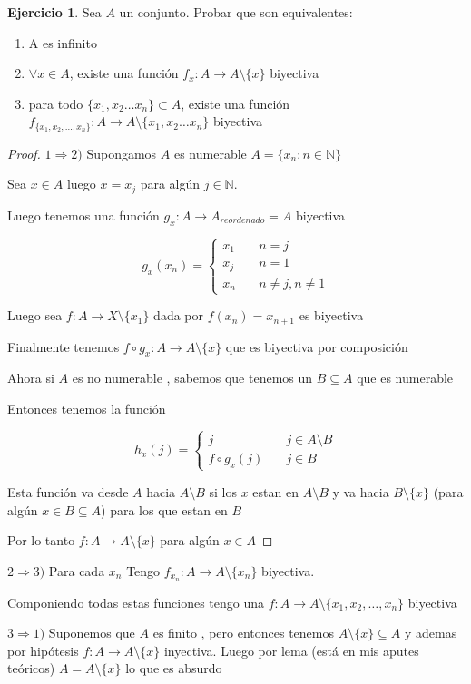 \documentclass[12pt]{article}
\newcommand{\N}{\mathbb{N}}
\newcommand{\Ra}{\Rightarrow}
\newcommand{\ra}{\rightarrow}
\theoremstyle{definition}
\newtheorem{ej}{Ejercicio}
\begin{document}
  \begin{ej}
\noindent  Sea $A$ un conjunto. Probar que son equivalentes:
\begin{enumerate}
  \item A es infinito 
  \item $\forall x \in A$, existe una función $f_{x}: A \ra A \setminus \{x\}$ biyectiva
  \item para todo $\{x_{1}, x_{2} \dots x_{n}\} \subset A$, existe una función $f_{\{ x_{1}, x_{2}, \dots , x_{n} \}}: A \ra A \setminus \{x_{1},x_{2} \dots x_{n} \}$ biyectiva
\end{enumerate}

\begin{proof}
   $1 \Ra 2 )$ Supongamos $A$ es numerable $A = \{x_{n} : n \in \N \}$

   Sea $x \in A$ luego $x = x_{j}$ para algún $j \in \N$.
  
   Luego tenemos una función $g_{x}: A \ra A_{reordenado} = A$ biyectiva

$$
g_{x}(x_{n}) = \left\{
        \begin{array}{ll}
	  x_{1} & \quad n = j \\
          x_{j} & \quad n = 1 \\
          x_{n} & \quad n \neq j, n \neq 1
        \end{array}
    \right.
$$

   Luego sea $f: A \ra X \setminus \{x_{1}\}$ dada por $f(x_{n}) = x_{n + 1}$ es biyectiva

   Finalmente tenemos $f \circ g_{x} : A \ra A \setminus \{x\}$ que es biyectiva por composición

   Ahora si $A$ es no numerable , sabemos que tenemos un $B \subseteq A$ que es numerable 

   Entonces tenemos la función 

$$
h_{x}(j) = \left\{
        \begin{array}{ll}
	
          j & \quad j \in A \setminus B \\
	  f \circ g_x (j) & \quad j \in B
        \end{array}
    \right.
$$

Esta función va desde $A$ hacia $A \setminus B$ si los $x$ estan en $A \setminus B$ y va hacia $B \setminus \{x\}$ (para algún $x \in B\subseteq A$) para los que estan en $B$

Por lo tanto $f: A \ra A \setminus \{x\}$ para algún $x \in A$
\end{proof}

$2 \Ra 3) $ Para cada $x_{n}$ Tengo $f_{x_{n}} : A \ra A \setminus \{x_{n}\}$ biyectiva.

Componiendo todas estas funciones tengo una $f: A \ra A \setminus \{x_{1} , x_{2}, \dots , x_{n}\}$ biyectiva

$3 \Ra 1)$ Suponemos que $A$ es finito , pero entonces tenemos $A \setminus\{x\} \subseteq A$ y ademas por hipótesis $f: A \ra A \setminus \{x\}$ inyectiva. Luego por lema (está en mis aputes teóricos) $A = A \setminus \{x\}$ lo que es absurdo
\end{ej}
\end{document}
